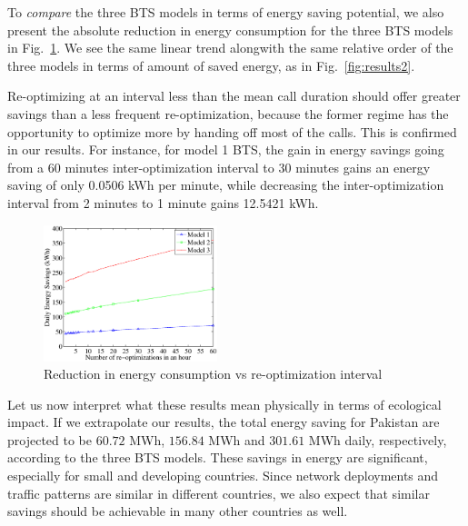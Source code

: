 
To \textit{compare} the three BTS models in terms of energy saving potential, we also present the absolute reduction in energy consumption for the three BTS models in Fig.~\ref{fig:results4}. We see the same linear trend alongwith the same relative order of the three models in terms of amount of saved energy, as in Fig.~\ref{fig:results2}. 

Re-optimizing at an interval less than the mean call duration should offer greater savings than a less frequent re-optimization, because the former regime has the opportunity to optimize more by handing off most of the calls. This is confirmed in our results. For instance, for model 1 BTS, the gain in energy savings going from a 60 minutes inter-optimization interval to 30 minutes gains an energy saving of only 0.0506 kWh per minute, while decreasing the inter-optimization interval from 2 minutes to 1 minute gains 12.5421 kWh. %

\begin{figure}
\includegraphics[width=0.45\textwidth]{figures/e.savings.powersaving.eps}
\caption{Reduction in energy consumption vs re-optimization interval}
\label{fig:results4}
\end{figure}

Let us now interpret what these results mean physically in terms of ecological impact. If we extrapolate our results, the total energy saving for Pakistan are projected to be $60.72$ MWh, $156.84$ MWh and $301.61$ MWh daily, respectively, according to the three BTS models. These savings in energy are significant, especially for small and developing countries. Since network deployments and traffic patterns are similar in different countries, we also expect that similar savings should be achievable in many other countries as well.

